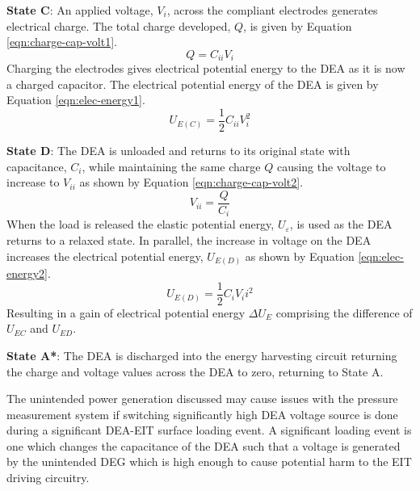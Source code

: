 \textbf{State C}: An applied voltage, $V_i$, across the compliant electrodes generates electrical charge. The total charge developed, $Q$, is given by Equation \ref{eqn:charge-cap-volt1}.
\begin{equation}
	Q = C_{ii}V_{i}
	\label{eqn:charge-cap-volt1}
\end{equation}
Charging the electrodes gives electrical potential energy to the DEA as it is now a charged capacitor. The electrical potential energy of the DEA is given by Equation \ref{eqn:elec-energy1}.
\begin{equation}
	U_{E(C)} = \frac{1}{2}C_{ii}V_i^2
	\label{eqn:elec-energy1}
\end{equation}

\textbf{State D}: The DEA is unloaded and returns to its original state with capacitance, $C_i$, while maintaining the same charge $Q$ causing the voltage to increase to $V_{ii}$ as shown by Equation \ref{eqn:charge-cap-volt2}.
\begin{equation}
	V_{ii} = \frac{Q}{C_{i}}
	\label{eqn:charge-cap-volt2}
\end{equation}
When the load is released the elastic potential energy, $U_{\varepsilon}$, is used as the DEA returns to a relaxed state. In parallel, the increase in voltage on the DEA increases the electrical potential energy, $U_{E(D)}$ as shown by Equation \ref{eqn:elec-energy2}.
\begin{equation}
	U_{E(D)} = \frac{1}{2}C_{i}V_ii^2
	\label{eqn:elec-energy2}
\end{equation}
Resulting in a gain of electrical potential energy $\Delta U_E$ comprising the difference of $U_{EC}$ and $U_{ED}$.

\textbf{State A*}: The DEA is discharged into the energy harvesting circuit returning the charge and voltage values across the DEA to zero, returning to State A. 

The unintended power generation discussed may cause issues with the pressure measurement system if switching significantly high DEA voltage source is done during a significant DEA-EIT surface loading event. A significant loading event is one which changes the capacitance of the DEA such that a voltage is generated by the unintended DEG which is high enough to cause potential harm to the EIT driving circuitry. 



